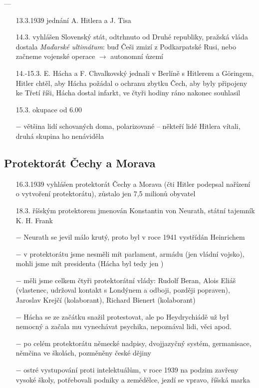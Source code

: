 \documentclass{article}
\begin{document}
---

\begin{itemize}
    \vspace{-0.5em}
    \setlength\itemsep{0.15em}
    \item[13.3.1939] jednání A. Hitlera a J. Tisa
    \item[14.3.] vyhlášen Slovenský stát, odtrhnuto od Druhé republiky, pražská vláda dostala \textit{Maďarské ultimátum}: buď Češi zmizí z Podkarpatské Rusi, nebo začneme vojenské operace $\rightarrow$ autonomní území
    \item[14.-15.3.] E. Hácha a F. Chvalkovský jednali v Berlíně s Hitlerem a Göringem, Hitler chtěl, aby Hácha požádal o ochranu zbytku Čech, aby byly připojeny ke Třetí říši, Hácha dostal infarkt, ve čtyři hodiny ráno nakonec souhlasil
    \item[15.3.] okupace od 6.00
    \item[$-$] většina lidí schovaných doma, polarizované -- někteří lidé Hitlera vítali, druhá skupina ho nenáviděla
\end{itemize}

\subsection*{Protektorát Čechy a Morava}
\begin{itemize}
    \vspace{-0.5em}
    \setlength\itemsep{0.15em}
    \item[16.3.1939] vyhlášen protektorát Čechy a Morava (čti Hitler podepsal nařízení o vytvoření protektorátu), zůstalo jen 7,5 milionů obyvatel
    \item[18.3.] říšským protektorem jmenován Konstantin von Neurath, státní tajemník K. H. Frank
    \item[$-$] Neurath se jevil málo krutý, proto byl v roce 1941 vystřídán Heinrichem
    \item[$-$] v protektorátu jsme nesměli mít parlament, armádu (jen vládní vojsko), mohli jsme mít presidenta (Hácha byl tedy jen )
    \item[$-$] měli jsme celkem čtyři protektorátní vlády: Rudolf Beran, Alois Eliáš (vlastenec, udržoval kontakt s Londýnem a odboji, později popraven), Jaroslav Krejčí (kolaborant), Richard Bienert (kolaborant)
    \item[$-$] Hácha se ze začátku snažil protestovat, ale po Heydrychiádě už byl nemocný a začala mu vynechávat psychika, nepoznával lidi, věci apod.
    \item[$-$] po celém protektorátu německé nadpisy, dvojjazyčný systém, germanisace, němčina ve školách, pozměněny české dějiny
    \item[$-$] ostré vystupování proti intelektuálům, v roce 1939 na podzim zavřeny vysoké školy, potřebovali podniky a zemědělce, jezdí se vpravo, říšská marka
\end{itemize}
\end{document}
